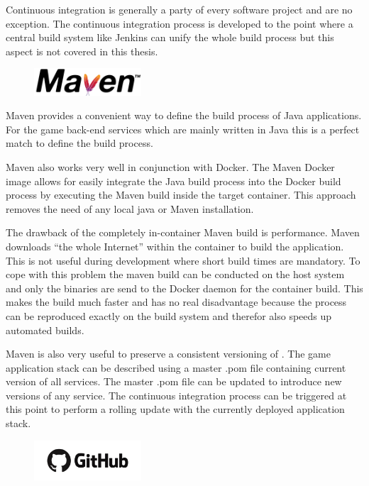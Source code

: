 Continuous integration is generally a party of every software project and \og{}
are no exception. The continuous integration process is developed to the point
where a central build system like Jenkins can unify the whole build process
but this aspect is not covered in this thesis.\\

\begin{figure}
    \includegraphics[width=4cm]{images/dependencies/maven}
\end{figure}

Maven provides a convenient way to define the build process of Java
applications. For the game back-end services which are mainly written in Java
this is a perfect match to define the build process.

Maven also works very well in conjunction with Docker. The Maven Docker image
allows for easily integrate the Java build process into the Docker build
process by executing the Maven build inside the target container. This approach
removes the need of any local java or Maven installation. 

The drawback of the completely in-container Maven build is performance. Maven
downloads ``the whole Internet'' within the container to build the application.
This is not useful during development where short build times are mandatory. To
cope with this problem the maven build can be conducted on the host system and
only the binaries are send to the Docker daemon for the container build. This
makes the build much faster and has no real disadvantage because the process
can be reproduced exactly on the build system and therefor also speeds up
automated builds.

Maven is also very useful to preserve a consistent versioning of \mss{}. The
game application stack can be described using a master .pom file containing
current version of all services. The master .pom file can be updated to
introduce new versions of any service. The continuous integration process can
be triggered at this point to perform a rolling update with the currently
deployed application stack.\\
	
\begin{figure}
    \includegraphics[width=4cm]{images/dependencies/github}
\end{figure}


